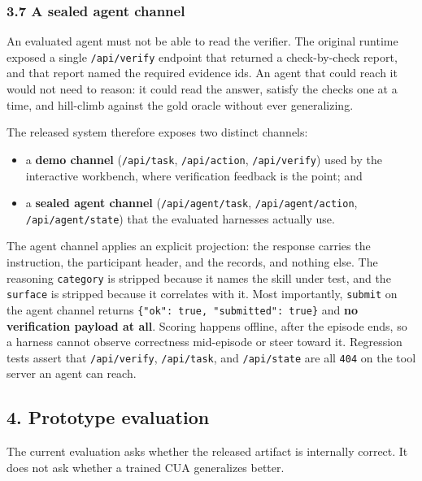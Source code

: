 \documentclass[
]{article}
\providecommand{\tightlist}{%
  \setlength{\itemsep}{0pt}\setlength{\parskip}{0pt}}
\begin{document}
\subsubsection{3.7 A sealed agent channel}\label{a-sealed-agent-channel}

An evaluated agent must not be able to read the verifier. The original
runtime exposed a single \texttt{/api/verify} endpoint that returned a
check-by-check report, and that report named the required evidence ids.
An agent that could reach it would not need to reason: it could read the
answer, satisfy the checks one at a time, and hill-climb against the
gold oracle without ever generalizing.

The released system therefore exposes two distinct channels:

\begin{itemize}
\tightlist
\item
  a \textbf{demo channel} (\texttt{/api/task}, \texttt{/api/action},
  \texttt{/api/verify}) used by the interactive workbench, where
  verification feedback is the point; and
\item
  a \textbf{sealed agent channel} (\texttt{/api/agent/task},
  \texttt{/api/agent/action}, \texttt{/api/agent/state}) that the
  evaluated harnesses actually use.
\end{itemize}

The agent channel applies an explicit projection: the response carries
the instruction, the participant header, and the records, and nothing
else. The reasoning \texttt{category} is stripped because it names the
skill under test, and the \texttt{surface} is stripped because it
correlates with it. Most importantly, \texttt{submit} on the agent
channel returns \texttt{\{"ok":\ true,\ "submitted":\ true\}} and
\textbf{no verification payload at all}. Scoring happens offline, after
the episode ends, so a harness cannot observe correctness mid-episode or
steer toward it. Regression tests assert that \texttt{/api/verify},
\texttt{/api/task}, and \texttt{/api/state} are all \texttt{404} on the
tool server an agent can reach.

\subsection{4. Prototype evaluation}\label{prototype-evaluation}

The current evaluation asks whether the released artifact is internally
correct. It does not ask whether a trained CUA generalizes better.
\end{document}
